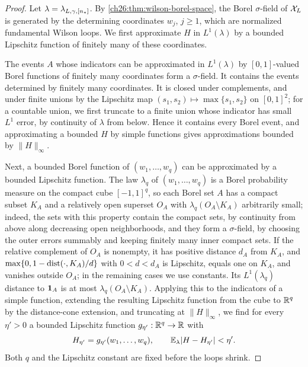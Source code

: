 \begin{proof}
Let $\lambda=\lambda_{L,\gamma,[n_*]}$. By \cref{ch26:thm:wilson-borel-space}, the Borel $\sigma$-field of $\mathcal X_L$ is generated by the determining coordinates $w_j$, $j\ge1$, which are normalized fundamental Wilson loops. We first approximate $H$ in $L^1(\lambda)$ by a bounded Lipschitz function of finitely many of these coordinates.

The events $A$ whose indicators can be approximated in $L^1(\lambda)$ by $[0,1]$-valued Borel functions of finitely many coordinates form a $\sigma$-field. It contains the events determined by finitely many coordinates. It is closed under complements, and under finite unions by the Lipschitz map $(s_1,s_2)\mapsto\max\{s_1,s_2\}$ on $[0,1]^2$; for a countable union, we first truncate to a finite union whose indicator has small $L^1$ error, by continuity of $\lambda$ from below. Hence it contains every Borel event, and approximating a bounded $H$ by simple functions gives approximations bounded by $\|H\|_\infty$.

Next, a bounded Borel function of $(w_1,\dots,w_q)$ can be approximated by a bounded Lipschitz function. The law $\lambda_q$ of $(w_1,\dots,w_q)$ is a Borel probability measure on the compact cube $[-1,1]^q$, so each Borel set $A$ has a compact subset $K_A$ and a relatively open superset $O_A$ with $\lambda_q(O_A\setminus K_A)$ arbitrarily small; indeed, the sets with this property contain the compact sets, by continuity from above along decreasing open neighborhoods, and they form a $\sigma$-field, by choosing the outer errors summably and keeping finitely many inner compact sets. If the relative complement of $O_A$ is nonempty, it has positive distance $d_A$ from $K_A$, and $\max\{0,1-\operatorname{dist}(\cdot,K_A)/d\}$ with $0<d<d_A$ is Lipschitz, equals one on $K_A$, and vanishes outside $O_A$; in the remaining cases we use constants. Its $L^1(\lambda_q)$ distance to $\mathbf 1_A$ is at most $\lambda_q(O_A\setminus K_A)$. Applying this to the indicators of a simple function, extending the resulting Lipschitz function from the cube to $\mathbb R^q$ by the distance-cone extension, and truncating at $\|H\|_\infty$, we find for every $\eta'>0$ a bounded Lipschitz function $g_{\eta'}:\mathbb R^q\to\mathbb R$ with
\[
 H_{\eta'}=g_{\eta'}(w_1,\dots,w_q),\qquad \mathbb E_\lambda|H-H_{\eta'}|<\eta'.
\]
Both $q$ and the Lipschitz constant are fixed before the loops shrink.


\end{proof}
